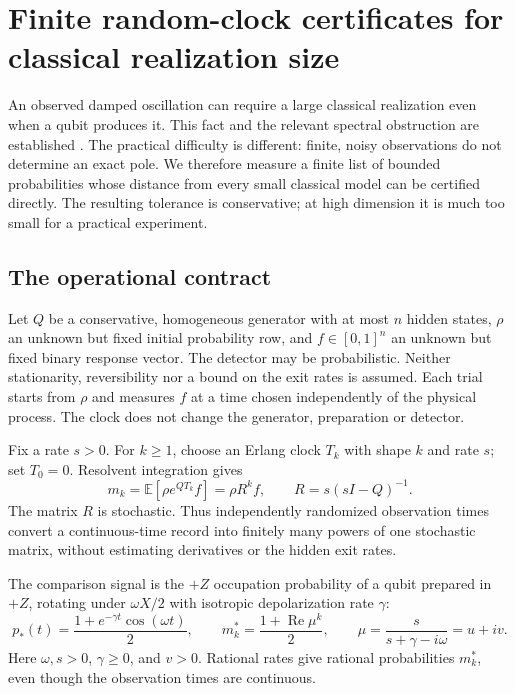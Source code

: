 \chapter{Finite random-clock certificates for classical realization size}
\label{ch:finite-erlang}

An observed damped oscillation can require a large classical realization even
when a qubit produces it. This fact and the relevant spectral obstruction are
established \cite{rrWolf2009}. The practical difficulty is different: finite,
noisy observations do not determine an exact pole. We therefore measure a finite
list of bounded probabilities whose distance from every small classical model
can be certified directly. The resulting tolerance is conservative; at high
dimension it is much too small for a practical experiment.

\section{The operational contract}
Let $Q$ be a conservative, homogeneous generator with at most $n$ hidden states,
$\rho$ an unknown but fixed initial probability row, and $f\in[0,1]^n$ an unknown
but fixed binary response vector. The detector may be probabilistic. Neither
stationarity, reversibility nor a bound on the exit rates is assumed. Each trial
starts from $\rho$ and measures $f$ at a time chosen independently of the physical
process. The clock does not change the generator, preparation or detector.

Fix a rate $s>0$. For $k\geq1$, choose an Erlang clock $T_k$ with shape $k$ and
rate $s$; set $T_0=0$. Resolvent integration gives
\begin{equation}
 m_k=\mathbb E[\rho e^{QT_k}f]=\rho R^k f,
 \qquad R=s(sI-Q)^{-1}.
 \label{eq:erlang-resolvent}
\end{equation}
The matrix $R$ is stochastic. Thus independently randomized observation times
convert a continuous-time record into finitely many powers of one stochastic
matrix, without estimating derivatives or the hidden exit rates.

The comparison signal is the $+Z$ occupation probability of a qubit prepared
in $+Z$, rotating under $\omega X/2$ with isotropic depolarization rate $\gamma$:
\begin{equation}
 p_*(t)=\frac{1+e^{-\gamma t}\cos(\omega t)}2,
 \qquad
 m_k^*=\frac{1+\operatorname{Re}\mu^k}2,
 \qquad \mu=\frac{s}{s+\gamma-i\omega}=u+iv.
 \label{eq:erlang-qubit}
\end{equation}
Here $\omega,s>0$, $\gamma\geq0$, and $v>0$. Rational rates give rational
probabilities $m_k^*$, even though the observation times are continuous.

